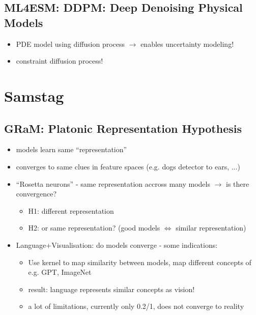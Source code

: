 \documentclass[a4paper]{article}
\begin{document}
\subsection*{ML4ESM: DDPM: Deep Denoising Physical Models}
\begin{itemize}
    \item PDE model using diffusion process $\rightarrow$ enables uncertainty modeling!
    \item constraint diffusion process!
\end{itemize}
\section*{Samstag}
\subsection*{GRaM: Platonic Representation Hypothesis}
\begin{itemize}
    \item models learn same \enquote{representation}
    \item converges to same clues in feature spaces (e.g. dogs detector to ears, ...)
    \item \enquote{Rosetta neurons} - same representation accross many models $\rightarrow$ is there convergence?
          \begin{itemize}
              \item H1: different representation
              \item H2: or same representation? (good models $\Leftrightarrow$ similar representation)
          \end{itemize}
    \item Language+Visualisation: do models converge - some indications:
          \begin{itemize}
              \item Use kernel to map similarity between models, map different concepts of e.g. GPT, ImageNet
              \item result: language represents similar concepts as vision!
              \item a lot of limitations, currently only 0.2/1, does not converge to reality
          \end{itemize}
\end{itemize}
\end{document}
